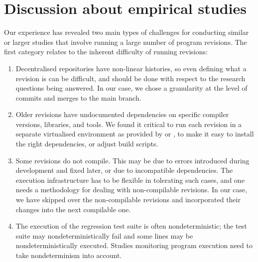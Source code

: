 \section{Discussion about empirical studies}
\label{evolution:discussion}


Our experience has revealed two main types of challenges for conducting similar
or larger studies that involve running a large number of program revisions. The
first category relates to the inherent difficulty of running revisions:

\begin{enumerate}
\item Decentralised repositories have non-linear histories, so even
  defining what a revision is can be difficult, and should be done
  with respect to the research questions being answered.  In our case,
  we chose a granularity at the level of commits and merges to the
  main branch.

\item Older revisions have undocumented dependencies on specific
  compiler versions, libraries, and tools.  We found it critical to run each
  revision in a separate virtualised environment as provided by \lxc or
  \docker, to make it easy to install the right dependencies, or adjust build
  scripts.

\item Some revisions do not compile.  This may be due to errors
  introduced during development and fixed later, or due to incompatible
  dependencies. The execution infrastructure has to be
  flexible in tolerating such cases, and one needs a methodology for
  dealing with non-compilable revisions.  In our case, we have skipped
  over the non-compilable revisions and incorporated their changes into
  the next compilable one.

\item The execution of the regression test suite is often
  nondeterministic; the test suite may nondeterministically fail
  and some lines may be nondeterministically executed. Studies
  monitoring program execution need to take nondeterminism
  into account.
\end{enumerate}


